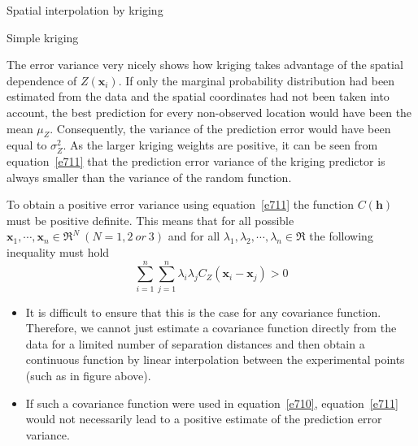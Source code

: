 \documentclass[8pt]{beamer}
\renewcommand{\emph}[1]{\textcolor{myorange}{#1}}
\begin{document}
 \begin{frame}{Spatial interpolation by kriging}
    \begin{block}{Simple kriging}
    \end{block}
    The \emph{error variance} very nicely shows how \emph{kriging} takes advantage of the spatial dependence of $Z(\mathbf{x}_i)$. If only the \emph{marginal probability distribution} had been estimated from the data and the spatial coordinates had not been taken into account, the best prediction for every non-observed location would have been the \emph{mean} $\mu_Z$. Consequently, the \emph{variance} of the \emph{prediction error} would have been equal to $\sigma_Z^2$. As the larger \emph{kriging weights} are positive, it can be seen from equation~\ref{e711} that the \emph{prediction error variance} of the \emph{kriging predictor} is always smaller than the variance of the \emph{random function}.

    To obtain a \emph{positive error variance} using equation~\ref{e711} the function $C(\mathbf{h})$ must be \emph{positive definite}. This means that for all possible $\mathbf{x}_1,\cdots,\mathbf{x}_n \in \Re^N \ (N=1,2\ or\ 3)$ and for all $\lambda_1, \lambda_2, \cdots, \lambda_n \in \Re$ the following inequality must hold
            \begin{equation}
                \sum_{i=1}^n \sum_{j=1}^n \lambda_i \lambda_j C_Z (\mathbf{x}_i - \mathbf{x}_j ) > 0
                \label{e712}
            \end{equation}
            \begin{itemize}
                \item It is difficult to ensure that this is the case for any \emph{covariance function}. Therefore, we cannot just estimate a \emph{covariance function} directly from the data for a limited number of separation distances and then obtain a \emph{continuous function} by \emph{linear interpolation} between the experimental points (such as in figure above). 
                \item If such a \emph{covariance function} were used in equation~\ref{e710}, equation~\ref{e711} would not necessarily lead to a positive estimate of the \emph{prediction error variance}. 
            \end{itemize}
\end{frame}
\end{document}
